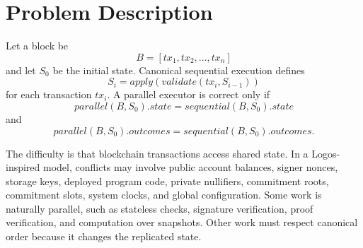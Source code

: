 \documentclass[runningheads]{llncs}
\begin{document}
\begin{table}
\centering
\caption{Taxonomy of deterministic parallel blockchain execution strategies.}
\label{tab:taxonomy}
\end{table}

\section{Problem Description}

Let a block be
\[
B = [tx_1, tx_2, \ldots, tx_n]
\]
and let $S_0$ be the initial state. Canonical sequential execution defines
\[
S_i = apply(validate(tx_i, S_{i-1}))
\]
for each transaction $tx_i$. A parallel executor is correct only if
\[
parallel(B,S_0).state = sequential(B,S_0).state
\]
and
\[
parallel(B,S_0).outcomes = sequential(B,S_0).outcomes.
\]

The difficulty is that blockchain transactions access shared state. In a Logos-inspired model, conflicts may involve public account balances, signer nonces, storage keys, deployed program code, private nullifiers, commitment roots, commitment slots, system clocks, and global configuration. Some work is naturally parallel, such as stateless checks, signature verification, proof verification, and computation over snapshots. Other work must respect canonical order because it changes the replicated state.
\end{document}
